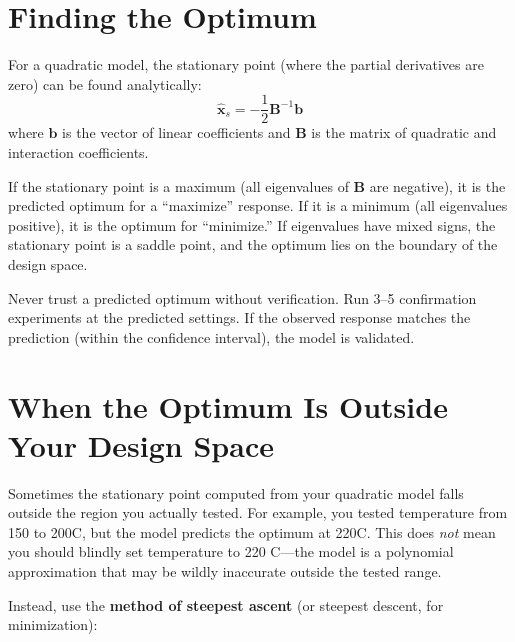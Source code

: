 \documentclass[11pt]{book}
\begin{document}
\section{Finding the Optimum}

For a quadratic model, the stationary point (where the partial derivatives are
zero) can be found analytically:
\[
\hat{\mathbf{x}}_s = -\frac{1}{2}\mathbf{B}^{-1}\mathbf{b}
\]
where $\mathbf{b}$ is the vector of linear coefficients and $\mathbf{B}$ is the
matrix of quadratic and interaction coefficients.

If the stationary point is a maximum (all eigenvalues of $\mathbf{B}$ are
negative), it is the predicted optimum for a ``maximize'' response. If it is a
minimum (all eigenvalues positive), it is the optimum for ``minimize.'' If
eigenvalues have mixed signs, the stationary point is a saddle point, and the
optimum lies on the boundary of the design space.

\begin{keypoint}
Never trust a predicted optimum without verification. Run 3--5 confirmation
experiments at the predicted settings. If the observed response matches the
prediction (within the confidence interval), the model is validated.
\end{keypoint}

\section{When the Optimum Is Outside Your Design Space}

Sometimes the stationary point computed from your quadratic model falls outside
the region you actually tested. For example, you tested temperature from 150 to
200\textdegree C, but the model predicts the optimum at 220\textdegree C. This
does \emph{not} mean you should blindly set temperature to 220\textdegree
C---the model is a polynomial approximation that may be wildly inaccurate
outside the tested range.

Instead, use the \textbf{method of steepest ascent} (or steepest descent, for
minimization):
\end{document}
